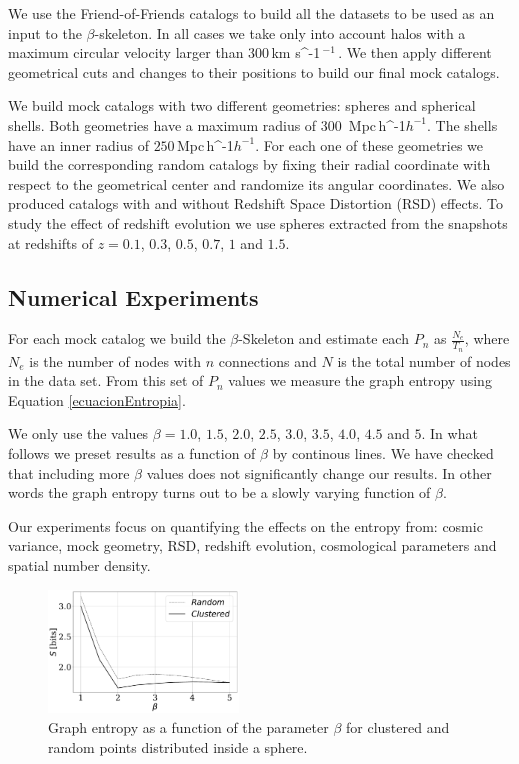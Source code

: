 \documentclass[fleqn,usenatbib]{mnras}
\newcommand{\kms}{\,{\rm km s}\ifmmode ^{-1}\,\else $^{-1}$\,\fi}
\newcommand{\Mpch}{\,{\rm Mpc}\,\ifmmode h^{-1}\else $h^{-1}$\fi}
\begin{document}
We use the Friend-of-Friends catalogs to build all the datasets to be used
as an input to the $\beta$-skeleton. In all cases we take only into account halos
with a maximum circular velocity larger than $300$\kms. 
We then apply different geometrical cuts and changes to their positions to build 
our final mock catalogs.

We build mock catalogs with two different geometries: spheres and spherical shells.
Both geometries have a maximum radius of $300$ \Mpch.
The shells have an inner radius of $250$\Mpch.
For each one of these geometries we build the corresponding random catalogs
by fixing their radial coordinate with respect to the geometrical center and 
randomize its angular coordinates.
We also produced catalogs with and without Redshift Space Distortion (RSD) effects. 
To study the effect of redshift evolution we use spheres extracted from
the snapshots at redshifts of $z=0.1$, $0.3$, $0.5$, $0.7$, $1$ and $1.5$.



\subsection{Numerical Experiments}

For each mock catalog we build the $\beta$-Skeleton and estimate each $P_n$ as  $\frac{N_e}{T_n}$, where $N_e$ is the number of nodes with $n$ connections and $N$ is the
total number of nodes in the data set.
From this set of $P_n$ values we measure the graph entropy using Equation \ref{ecuacionEntropia}.

We only use the values $\beta=1.0$, $1.5$, $2.0$, $2.5$, $3.0$, $3.5$, $4.0$, $4.5$ and $5$.
In what follows we preset results as a function of $\beta$ by continous lines.
We have checked that including more $\beta$ values does not significantly change
our results. 
In other words the graph entropy turns out to be a slowly varying function of $\beta$.


Our experiments focus on quantifying the effects on the entropy from:
cosmic variance, mock geometry, RSD, redshift evolution, cosmological
parameters and spatial number density. 


\begin{figure}
    \includegraphics[width=0.45\textwidth]{entropy.pdf}
    \caption{Graph entropy as a function of the parameter $\beta$ 
    for clustered and random points distributed inside a sphere. \label{fig:entropy}}
\end{figure}
\end{document}
